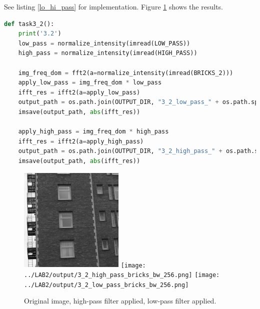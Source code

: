 See listing \ref{lo_hi_pass} for implementation. Figure \ref{lo_hi_pass_figure} shows the results.

\begin{lstlisting}[language=Python, label=lo_hi_pass, caption=Fourier transform and spectrum image]
def task3_2():
    print('3.2')
    low_pass = normalize_intensity(imread(LOW_PASS))
    high_pass = normalize_intensity(imread(HIGH_PASS))

    img_freq_dom = fft2(a=normalize_intensity(imread(BRICKS_2)))
    apply_low_pass = img_freq_dom * low_pass
    ifft_res = ifft2(a=apply_low_pass)
    output_path = os.path.join(OUTPUT_DIR, "3_2_low_pass_" + os.path.split(BRICKS_2)[-1])
    imsave(output_path, abs(ifft_res))

    apply_high_pass = img_freq_dom * high_pass
    ifft_res = ifft2(a=apply_high_pass)
    output_path = os.path.join(OUTPUT_DIR, "3_2_high_pass_" + os.path.split(BRICKS_2)[-1])
    imsave(output_path, abs(ifft_res))
\end{lstlisting}

\begin{figure}[h!]
    \centering
    \includegraphics[width=5cm]{../LAB2/img/bricks_bw_256.png}
    \texttt{[image: ../LAB2/output/3\_2\_high\_pass\_bricks\_bw\_256.png]}
    \texttt{[image: ../LAB2/output/3\_2\_low\_pass\_bricks\_bw\_256.png]}
    \caption{Original image, high-pass filter applied, low-pass filter applied.}
    \label{lo_hi_pass_figure}
\end{figure}
